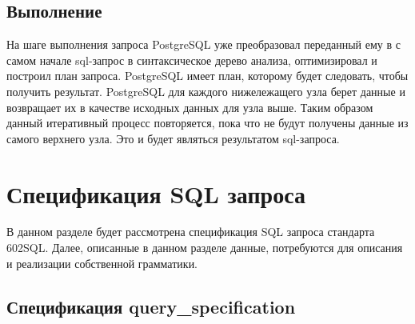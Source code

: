 \begin{figure}[ht!]
\end{figure}

\newpage

\subsection{Выполнение}

На шаге выполнения запроса PostgreSQL уже преобразовал переданный ему в с самом начале 
sql-запрос в синтаксическое дерево анализа, оптимизировал и построил план запроса.
PostgreSQL имеет план, которому будет следовать, чтобы получить результат.
PostgreSQL для каждого нижележащего узла берет данные и возвращает их 
в качестве исходных данных для узла выше. 
Таким образом данный итеративный процесс повторяется,
пока что не будут получены данные из самого верхнего узла.
Это и будет являться результатом sql-запроса.

\section{Спецификация SQL запроса}

В данном разделе будет рассмотрена спецификация SQL запроса стандарта 602SQL.
Далее, описанные в данном разделе данные, потребуются для описания и реализации собственной грамматики.

\subsection{Спецификация query\_specification}

